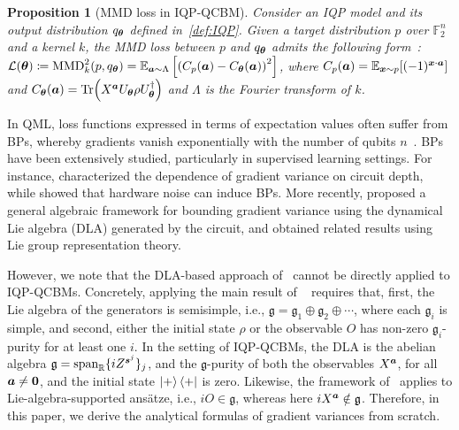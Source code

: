 \documentclass{article}
\theoremstyle{plain}
\newtheorem{proposition}[theorem]{Proposition}
\theoremstyle{definition}
\theoremstyle{remark}
\begin{document}
\begin{proposition} [MMD loss in IQP-QCBM]\label{prop:mmd-loss}
Consider an IQP model and its output distribution $q_{\bm{\theta}}$ defined in~\cref{def:IQP}. Given a target distribution $p$ over $\mathbb{F}_2^n$ and a kernel $k$, the MMD loss between $p$ and $q_{\bm{\theta}}$ admits the following form~\citep{rudolph24, recioarmengol25}: $\mathcal{L}({\bm{\theta}}) \coloneqq \mathrm{MMD}^2_k(p, q_{\bm{\theta}}) = \operatorname*{\mathbb{E}}_{{\bm{a}} \sim \Lambda} \left[ \left( C_p({\bm{a}}) - C_{\bm{\theta}}({\bm{a}}) \right)^2 \right]$,
where $C_p({\bm{a}})  = \operatorname*{\mathbb{E}}_{{\bm{x}} \sim p}[(-1)^{{\bm{x}} \cdot {\bm{a}}}]$ and $C_{\bm{\theta}}({\bm{a}})=\Tr(X^{{\bm{a}}}U_{\bm{\theta}}\rho U_{\bm{\theta}}^\dagger)$ and $\Lambda$ is the Fourier transform of $k$.  
\end{proposition}
In QML, loss functions expressed in terms of expectation values often suffer from BPs, whereby gradients vanish exponentially with the number of qubits $n$~\citep{mcclean18}. BPs have been extensively studied, particularly in supervised learning settings. For instance, \citet{Cerezo21} characterized the dependence of gradient variance on circuit depth, while \citet{Wang21} showed that hardware noise can induce BPs. More recently, \citet{Ragone24} proposed a general algebraic framework for bounding gradient variance using the dynamical Lie algebra (DLA) generated by the circuit, and \citet{fontana2024characterizing} obtained related results using Lie group representation theory.

However, we note that the DLA-based approach of~\citet{Ragone24} cannot be directly applied to IQP-QCBMs. Concretely, applying the main result of ~\citet{Ragone24} requires that, first, the Lie algebra of the generators is semisimple, i.e., $\mathfrak{g} = \mathfrak{g}_{1}\oplus \mathfrak{g}_{2}\oplus\cdots$, where each $\mathfrak{g}_i$ is simple, and second, either the initial state $\rho$ or the observable $O$ has non-zero $\mathfrak{g}_{i}$-purity for at least one $i$. In the setting of IQP-QCBMs, the DLA is the abelian algebra $\mathfrak{g}=\operatorname{span}_{\mathbb{R}}\{iZ^{{\bm{s}^j}}\}_j$, and the $\mathfrak{g}$-purity of both the observables $X^{{\bm{a}}}$, for all ${\bm{a}}\neq\bm 0$, and the initial state $\ket{+}\bra{+}$ is zero. Likewise, the framework of~\citet{fontana2024characterizing} applies to Lie-algebra-supported ansätze, i.e., $iO\in\mathfrak{g}$, whereas here $iX^{{\bm{a}}}\notin\mathfrak{g}$. Therefore, in this paper, we derive the analytical formulas of gradient variances from scratch.
\end{document}

